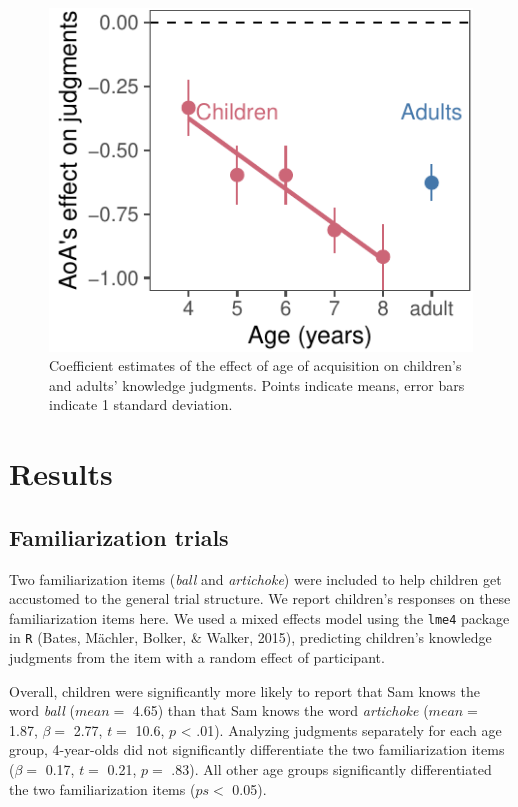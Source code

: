 \documentclass[10pt, letterpaper]{article}
\newenvironment{CodeChunk}{}{}
\begin{document}
\begin{CodeChunk}
\begin{figure}[tb]
\includegraphics{figs/age_terms-1} \caption[Coefficient estimates of the effect of age of acquisition on children's and adults' knowledge judgments]{Coefficient estimates of the effect of age of acquisition on children's and adults' knowledge judgments. Points indicate means, error bars indicate 1 standard deviation.}\label{fig:age_terms}
\end{figure}
\end{CodeChunk}

\hypertarget{results}{%
\section{Results}\label{results}}

\hypertarget{familiarization-trials}{%
\subsection{Familiarization trials}\label{familiarization-trials}}

Two familiarization items (\emph{ball} and \emph{artichoke}) were
included to help children get accustomed to the general trial structure.
We report children's responses on these familiarization items here. We
used a mixed effects model using the \texttt{lme4} package in \texttt{R}
(Bates, Mächler, Bolker, \& Walker, 2015), predicting children's
knowledge judgments from the item with a random effect of participant.

Overall, children were significantly more likely to report that Sam
knows the word \emph{ball} (\(mean =\) 4.65) than that Sam knows the
word \emph{artichoke} (\(mean =\) 1.87, \(\beta =\) 2.77, \(t =\) 10.6,
\(p\) \textless{} .01). Analyzing judgments separately for each age
group, 4-year-olds did not significantly differentiate the two
familiarization items (\(\beta =\) 0.17, \(t =\) 0.21, \(p =\) .83). All
other age groups significantly differentiated the two familiarization
items (\(ps <\) 0.05).
\end{document}

